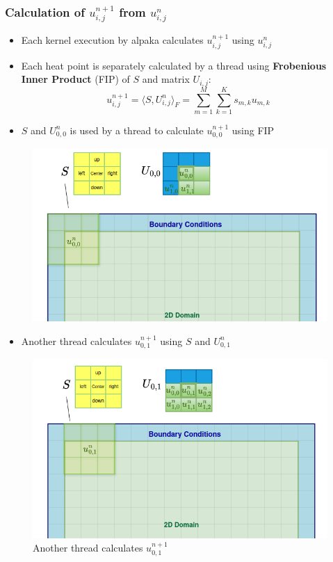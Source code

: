 \documentclass[9pt]{beamer}
\begin{document}
\begin{frame}
\frametitle{Calculation of $u_{i,j}^{n+1}$ from $u_{i,j}^{n}$}
\vspace{-0.1\baselineskip}
    \begin{itemize}
        \item Each kernel execution by alpaka calculates $u_{i,j}^{n+1}$ using $u_{i,j}^{n}$
        \item Each heat point is separately calculated by a thread using \textbf{Frobenious Inner Product} (FIP) of \( S \) and matrix \( U_{i,j} \):
\[
 u_{i,j}^{n+1} = \langle S, U^{n}_{i,j} \rangle_F = \sum_{m=1}^{M} \sum_{k=1}^{K} s_{m,k} u_{m,k}
\]
        \item $S$ and $U^{n}_{0,0}$ is used  by a thread to calculate $u_{0,0}^{n+1}$ using FIP
    \end{itemize}
    \begin{figure}
        \centering
            \includegraphics[width=0.75\linewidth, height=0.4\textheight]{Screenshot from 2024-09-22 00-16-53.png}
        \label{fig:enter-label}
    \end{figure}
\end{frame}

\begin{frame}
\vspace{-0.9\baselineskip}
    \begin{itemize}
        \item Another thread calculates $u_{0,1}^{n+1}$  using $S$ and $U^{n}_{0,1}$
    \end{itemize}
    \begin{figure}
        \centering
        \includegraphics[width=0.8\linewidth,height=0.45\linewidth]{Screenshot from 2024-09-21 23-44-50.png}
        \caption{Another thread calculates $u_{0,1}^{n+1}$ }
        \label{fig:enter-label}
    \end{figure}
\end{frame}
\end{document}
